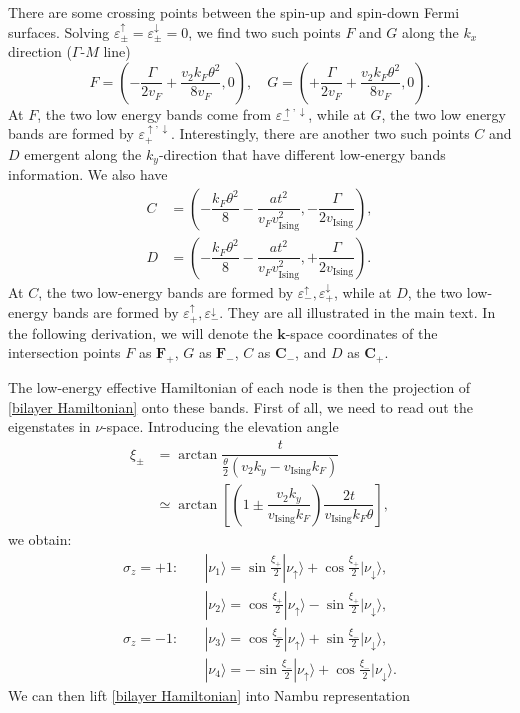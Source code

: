 \begin{subappendices}
	There are some crossing points between the spin-up and spin-down Fermi surfaces. Solving $\varepsilon_\pm^\uparrow=\varepsilon_\pm^\downarrow=0$, we find two such points $F$ and $G$ along the $k_x$ direction ($\Gamma$-$M$ line)
	\begin{equation}\label{F,G coordinates withouth Delta and phi}
		F=\left(-\dfrac{\Gamma}{2v_F}+\dfrac{v_2k_F\theta^2}{8v_F}, 0\right),\quad G=\left(+\dfrac{\Gamma}{2v_F}+\dfrac{v_2k_F\theta^2}{8v_F}, 0\right).
	\end{equation}
	At $F$, the two low energy bands come from $\varepsilon_-^{\uparrow,\downarrow}$, while at $G$, the two low energy bands are formed by $\varepsilon_+^{\uparrow,\downarrow}$. Interestingly, there are another two such points $C$ and $D$ emergent along the $k_y$-direction that have different low-energy bands information. We also have
	\begin{align}
		C & =\left(-\dfrac{k_F\theta^2}{8}-\dfrac{a t^2}{v_Fv_{\text{Ising}}^2}, -\dfrac{\Gamma}{2v_{\text{Ising}}}\right),\label{C coordinates withouth Delta and phi} \\
		D & =\left(-\dfrac{k_F\theta^2}{8}-\dfrac{a t^2}{v_Fv_{\text{Ising}}^2}, +\dfrac{\Gamma}{2v_{\text{Ising}}}\right).\label{D coordinates withouth Delta and phi}
	\end{align}
	At $C$, the two low-energy bands are formed by $\varepsilon_-^\uparrow,\varepsilon_+^\downarrow$, while at $D$, the two low-energy bands are formed by $\varepsilon_+^\uparrow,\varepsilon_-^\downarrow$. They are all illustrated in the main text. In the following derivation, we will denote the $\bm{k}$-space coordinates of the intersection points $F$ as $\bm{F}_+$, $G$ as $\bm{F}_-$, $C$ as $\bm{C}_-$, and $D$ as $\bm{C}_+$.\par
	The low-energy effective Hamiltonian of each node is then the projection of \eqref{bilayer Hamiltonian} onto these bands. First of all, we need to read out the eigenstates in $\nu$-space. Introducing the elevation angle
	\begin{align*}
		\xi_\pm & =\arctan\dfrac{t}{\frac\theta 2(v_2k_y-v_{\text{Ising}} k_F)}                                                           \\
		        & \simeq\arctan\left[\left(1\pm\dfrac{v_2k_y}{v_{\text{Ising}} k_F}\right)\dfrac{2t}{v_{\text{Ising}} k_F \theta}\right],
	\end{align*}
	we obtain:
	\begin{align*}
		\sigma_z=+1: & \quad|\nu_1\rangle=\sin\frac{\xi_+}{2}|\nu_\uparrow\rangle+\cos\frac{\xi_+}{2}|\nu_\downarrow\rangle,  \\
		             & \quad|\nu_2\rangle=\cos\frac{\xi_+}{2}|\nu_\uparrow\rangle-\sin\frac{\xi_+}{2}|\nu_\downarrow\rangle,  \\
		\sigma_z=-1: & \quad|\nu_3\rangle=\cos\frac{\xi_-}{2}|\nu_\uparrow\rangle+\sin\frac{\xi_-}{2}|\nu_\downarrow\rangle,  \\
		             & \quad|\nu_4\rangle=-\sin\frac{\xi_-}{2}|\nu_\uparrow\rangle+\cos\frac{\xi_-}{2}|\nu_\downarrow\rangle.
	\end{align*}
	We can then lift \eqref{bilayer Hamiltonian} into Nambu representation


\end{subappendices}

